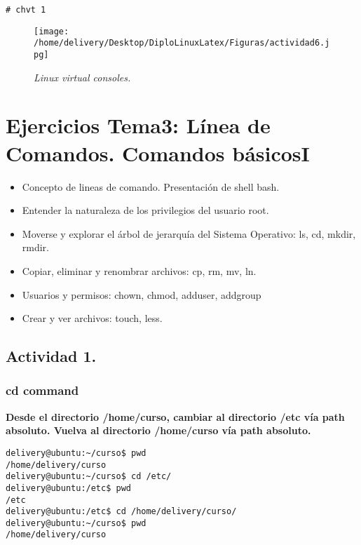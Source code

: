 \documentclass[a4paper,11pt,spanish]{article} %
\newenvironment{myscriptlisting}
{\begin{list}{}{\setlength{\leftmargin}{1em}}\item\scriptsize\bfseries}
{\end{list}}
\begin{document}
\texttt{\# chvt 1\\}

\cite{osamu}

\begin{figure}[h!] 
\centering
\texttt{[image: /home/delivery/Desktop/DiploLinuxLatex/Figuras/actividad6.jpg]}
\caption{\emph{Linux virtual consoles.}}
\end{figure}

\clearpage
\pagebreak

\section{Ejercicios Tema3: Línea de Comandos. Comandos básicosI }

\begin{itemize}
 \item Concepto de lineas de comando. Presentación de shell bash.
 \item Entender la naturaleza de los privilegios del usuario root.
 \item Moverse y explorar el árbol de jerarquía del Sistema Operativo: ls, cd, mkdir, rmdir.
 \item Copiar, eliminar y renombrar archivos: cp, rm, mv, ln.
 \item Usuarios y permisos: chown, chmod, adduser, addgroup
 \item Crear y ver archivos: touch, less.
\end{itemize}

\subsection{Actividad 1.}

\subsubsection{\ac{cd} command}

\textbf{Desde el directorio /home/curso, cambiar al directorio /etc vía path absoluto. 
Vuelva al directorio /home/curso vía path absoluto.}

\begin{myscriptlisting}
  \begin{verbatim}
delivery@ubuntu:~/curso$ pwd
/home/delivery/curso
delivery@ubuntu:~/curso$ cd /etc/
delivery@ubuntu:/etc$ pwd
/etc
delivery@ubuntu:/etc$ cd /home/delivery/curso/
delivery@ubuntu:~/curso$ pwd
/home/delivery/curso
  \end{verbatim}
\end{myscriptlisting}
\end{document}
